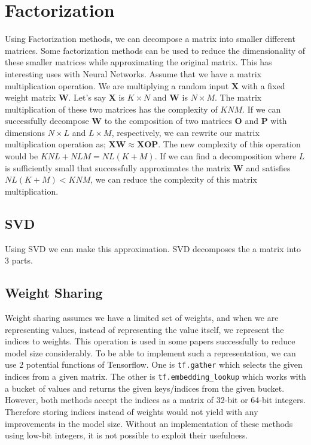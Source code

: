 \section{Factorization}
Using Factorization methods, we can decompose a matrix into smaller different matrices. Some factorization methods can be used to reduce the dimensionality of these smaller matrices while approximating the original matrix. This has interesting uses with Neural Networks. Assume that we have a matrix multiplication operation. We are multiplying a random input $\mathbf{X}$ with a fixed weight matrix $\mathbf{W}$. Let's say $\mathbf{X}$ is $K \times N$ and $\mathbf{W}$ is $N \times M$. The matrix multiplication of these two matrices has the complexity of $KNM$. If we can successfully decompose $\mathbf{W}$ to the composition of two matrices $\mathbf{O}$ and $\mathbf{P}$ with dimensions $N \times L$ and $L \times M$, respectively, we can rewrite our matrix multiplication operation as; $\mathbf{X}\mathbf{W} \approx \mathbf{X}\mathbf{O}\mathbf{P}$. The new complexity of this operation would be $KNL + NLM = NL(K+M)$. If we can find a decomposition where $L$ is sufficiently small that successfully approximates the matrix $\mathbf{W}$ and satisfies $NL(K+M) < KNM$, we can reduce the complexity of this matrix multiplication.
\subsection{SVD}
Using SVD we can make this approximation. SVD decomposes the a matrix into 3 parts. 


\subsection{Weight Sharing}
Weight sharing assumes we have a limited set of weights, and when we are representing values, instead of representing the value itself, we represent the indices to weights. This operation is used in some papers successfully to reduce model size considerably. To be able to implement such a representation, we can use 2 potential functions of Tensorflow. One is \texttt{tf.gather} which selects the given indices from a given matrix. The other is \texttt{tf.embedding\_lookup} which works with a bucket of values and returns the given keys/indices from the given bucket. However, both methods accept the indices as a matrix of 32-bit or 64-bit integers. Therefore storing indices instead of weights would not yield with any improvements in the model size. Without an implementation of these methods using low-bit integers, it is not possible to exploit their usefulness.

